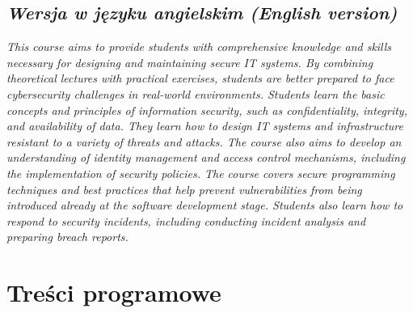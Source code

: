 \documentclass[12pt, a4paper]{article}
\begin{document}
\subsection*{\textit{Wersja w języku angielskim (English version)}}

\textit{This course aims to provide students with comprehensive knowledge and skills necessary for designing and maintaining secure IT systems. By combining theoretical lectures with practical exercises, students are better prepared to face cybersecurity challenges in real-world environments.  Students learn the basic concepts and principles of information security, such as confidentiality, integrity, and availability of data. They learn how to design IT systems and infrastructure resistant to a variety of threats and attacks. The course also aims to develop an understanding of identity management and access control mechanisms, including the implementation of security policies.  The course covers secure programming techniques and best practices that help prevent vulnerabilities from being introduced already at the software development stage. Students also learn how to respond to security incidents, including conducting incident analysis and preparing breach reports.}


\section{Treści programowe}
\end{document}
